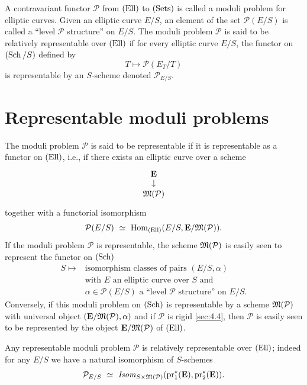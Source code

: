 A contravariant functor $\mathcal{P}$ from $(\mathrm{Ell})$ to $(\mathrm{Sets})$ is called a moduli problem for elliptic curves. Given an elliptic curve $E/S$, an element of the set $\mathcal{P}(E/S)$ is called a ``level $\mathcal{P}$ structure'' on $E/S$. The moduli problem $\mathcal{P}$ is said to be relatively representable over $(\mathrm{Ell})$ if for every elliptic curve $E/S$, the functor on $(\operatorname{Sch}/S)$ defined by
\[
T \longmapsto \mathcal{P}(E_T/T)
\]
is representable by an $S$-scheme denoted $\mathcal{P}_{E/S}$.

\section{Representable moduli problems}
\label{sec:4.3}

The moduli problem $\mathcal{P}$ is said to be representable if it is representable as a functor on $(\mathrm{Ell})$, i.e., if there exists an elliptic curve over a scheme
\[
\begin{tikzcd}[row sep=small, column sep=small]
\mathbf{E} \arrow[d] \\
\Mfrak(\mathcal{P})
\end{tikzcd}
\]
together with a functorial isomorphism
\[
\mathcal{P}(E/S) \ \simeq \ \operatorname{Hom}_{(\mathrm{Ell})}(E/S, \mathbf{E}/\mathfrak{M}(\mathcal{P})).
\]
If the moduli problem $\mathcal{P}$ is representable, the scheme $\mathfrak{M}(\mathcal{P})$ is easily seen to represent the functor on $(\operatorname{Sch})$
\begin{equation}\label{eq:4.3.1}
\begin{aligned}
S \longmapsto {} & \text{isomorphism classes of pairs } (E/S, \alpha) \\
& \text{with } E \text{ an elliptic curve over } S \text{ and} \\
& \alpha \in \mathcal{P}(E/S) \text{ a ``level } \mathcal{P} \text{ structure'' on } E/S.
\end{aligned}
\end{equation}
Conversely, if this moduli problem on $(\operatorname{Sch})$ is representable by a scheme $\mathfrak{M}(\mathcal{P})$ with universal object $(\mathbf{E}/\mathfrak{M}(\mathcal{P}), \alpha)$ and if $\mathcal{P}$ is rigid \ref{sec:4.4}, then $\mathcal{P}$ is easily seen to be represented by the object $\mathbf{E}/\mathfrak{M}(\mathcal{P})$ of $(\mathrm{Ell})$.

\kmeqitem\label{item:4.3.2}
Any representable moduli problem $\mathcal{P}$ is relatively representable over $(\mathrm{Ell})$; indeed for any $E/S$ we have a natural isomorphism of $S$-schemes
\begin{equation}\label{eq:4.3.3}
\mathcal{P}_{E/S} \ \simeq \ \mathit{Isom}_{S \times \mathfrak{M}(\mathcal{P})}(\mathrm{pr}_1^*(\mathbf{E}), \mathrm{pr}_2^*(\mathbf{E})).
\end{equation}

